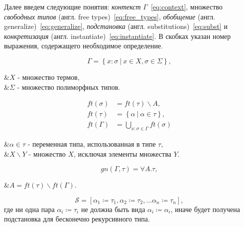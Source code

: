 Далее введем следующие понятия:
\textit{контекст} $\Gamma$~\eqref{eq:context},
множество \textit{свободных типов} (англ. free types)~\eqref{eq:free_types},
\textit{обобщение} (англ. generalize)~\eqref{eq:generalize},
\textit{подстановка} (англ. substitutions)~\eqref{eq:subst} и
\textit{конкретизация} (англ. instantiate)~\eqref{eq:instantiate}.
В скобках указан номер выражения, содержащего необходимое определение.

\begin{equation}
    \label{eq:context}
    \Gamma = \left\{ x: \sigma ~|~ x \in X, \sigma \in \Sigma \right\},
\end{equation}
\begin{eqrem}
    &$X$ - множество термов,\\
    &$\Sigma$ - множество полиморфных типов.\\
\end{eqrem}

\begin{equation}
    \label{eq:free_types}
    \begin{aligned}
        ft(\sigma) &= ft(\tau) \backslash A, \\
        ft(\tau)   &= \left\{ \alpha ~|~ \alpha \in \tau \right\}, \\
        ft(\Gamma) &= \bigcup_{x: \sigma \in \Gamma} ft(\sigma)
    \end{aligned}
\end{equation}
\begin{eqrem}
    &$\alpha \in \tau$ - переменная типа, использованная в типе $\tau$,\\
    &$X \backslash Y$ - множество $X$, исключая элементы множества $Y$.\\
\end{eqrem}

\begin{equation}
    \label{eq:generalize}
    gn(\Gamma, \tau) = \forall A. \tau,
\end{equation}
\begin{eqrem}
    &$A = ft(\tau) \backslash ft(\Gamma)$.\\
\end{eqrem}

\begin{equation}
    \label{eq:subst}
    \mathcal{S} = \left[ \alpha_1 \coloneqq \tau_1, \alpha_2 \coloneqq \tau_2, \ldots \alpha_n \coloneqq \tau_n \right],
\end{equation}
где ни одна пара $\alpha_i \coloneqq \tau_i$ не должна быть вида $\alpha_i \coloneqq \alpha_i$, иначе будет получена подстановка для бесконечно рекурсивного типа.

